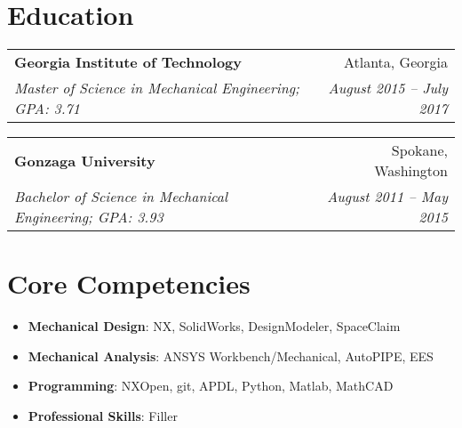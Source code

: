 \documentclass[letterpaper,11pt]{article}
\makeatletter
\newcommand{\resumeItem}[2]{
  \item\small{
    \textbf{#1}{: #2 \vspace{-2pt}}
  }
}
\newcommand{\resumeHeading}[4]{
    \begin{tabular*}{0.99\textwidth}[t]{l@{\extracolsep{\fill}}r}
      \textbf{#1} & #2 \\
      \textit{\small#3} & \textit{\small #4} \\
    \end{tabular*}\vspace{5pt}
}
\newcommand{\resumeSubItem}[2]{\resumeItem{#1}{#2}\vspace{-4pt}}
\newcommand{\resumeSubHeadingListStart}{\begin{itemize}[leftmargin=*]}
\newcommand{\resumeSubHeadingListEnd}{\end{itemize}}
\makeatother
\begin{document}
\section{Education}
    \resumeHeading
      {Georgia Institute of Technology}{Atlanta, Georgia}
      {Master of Science in Mechanical Engineering;  GPA: 3.71}{August 2015 -- July 2017}
    \resumeHeading
      {Gonzaga University}{Spokane, Washington}
      {Bachelor of Science in Mechanical Engineering;  GPA: 3.93}{August 2011 -- May 2015}

\section{Core Competencies}
  \resumeSubHeadingListStart
    \resumeSubItem{Mechanical Design}
      {NX, SolidWorks, DesignModeler, SpaceClaim}
    \resumeSubItem{Mechanical Analysis}
      {ANSYS Workbench/Mechanical, AutoPIPE, EES}
    \resumeSubItem{Programming}
      {NXOpen, git, APDL, Python, Matlab, MathCAD}
    \resumeSubItem{Professional Skills}
      {Filler}
  \resumeSubHeadingListEnd

%


\end{document}
